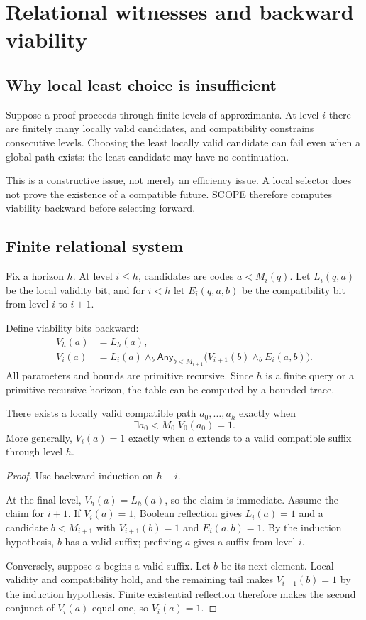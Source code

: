 \section{Relational witnesses and backward viability}
\label{sec:viability}

\subsection{Why local least choice is insufficient}

Suppose a proof proceeds through finite levels of approximants.  At level \(i\) there are finitely many locally valid candidates, and compatibility constrains consecutive levels.  Choosing the least locally valid candidate can fail even when a global path exists: the least candidate may have no continuation.

This is a constructive issue, not merely an efficiency issue.  A local selector does not prove the existence of a compatible future.  SCOPE therefore computes viability backward before selecting forward.

\subsection{Finite relational system}

Fix a horizon \(h\).  At level \(i\le h\), candidates are codes \(a<M_i(q)\).  Let \(L_i(q,a)\) be the local validity bit, and for \(i<h\) let \(E_i(q,a,b)\) be the compatibility bit from level \(i\) to \(i+1\).

Define viability bits backward:
\[
\begin{aligned}
V_h(a)&=L_h(a),\\
V_i(a)&=L_i(a)\wedge_b
  \mathsf{Any}_{b<M_{i+1}}\bigl(V_{i+1}(b)\wedge_b E_i(a,b)\bigr).
\end{aligned}
\]
All parameters and bounds are primitive recursive.  Since \(h\) is a finite query or a primitive-recursive horizon, the table can be computed by a bounded trace.

\begin{theorem}
\label{thm:viable-path}
There exists a locally valid compatible path \(a_0,\ldots,a_h\) exactly when
\[
  \exists a_0<M_0\;V_0(a_0)=1.
\]
More generally, \(V_i(a)=1\) exactly when \(a\) extends to a valid compatible suffix through level \(h\).
\end{theorem}
\begin{proof}
Use backward induction on \(h-i\).

At the final level, \(V_h(a)=L_h(a)\), so the claim is immediate.  Assume the claim for \(i+1\).  If \(V_i(a)=1\), Boolean reflection gives \(L_i(a)=1\) and a candidate \(b<M_{i+1}\) with \(V_{i+1}(b)=1\) and \(E_i(a,b)=1\).  By the induction hypothesis, \(b\) has a valid suffix; prefixing \(a\) gives a suffix from level \(i\).

Conversely, suppose \(a\) begins a valid suffix.  Let \(b\) be its next element.  Local validity and compatibility hold, and the remaining tail makes \(V_{i+1}(b)=1\) by the induction hypothesis.  Finite existential reflection therefore makes the second conjunct of \(V_i(a)\) equal one, so \(V_i(a)=1\).
\end{proof}

